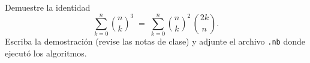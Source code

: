 Demuestre la identidad
    \[
      \sum_{k=0}^{n} \binom{n}{k}^3
      \;=\;
      \sum_{k=0}^{n} \binom{n}{k}^2 \,\binom{2k}{n}.
    \]
    Escriba la demostración (revise las notas de clase) y adjunte el archivo \texttt{.nb} donde ejecutó los algoritmos.
